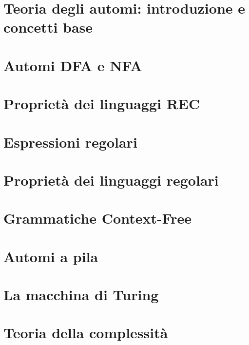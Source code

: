 \documentclass[12pt]{article}
\begin{document}


\tableofcontents
\restoregeometry

\section{Teoria degli automi: introduzione e concetti base}



\section{Automi DFA e NFA}


\section{Proprietà dei linguaggi REC}


\section{Espressioni regolari}


\section{Proprietà dei linguaggi regolari}


\section{Grammatiche Context-Free}


\section{Automi a pila}


\section{La macchina di Turing}


\section{Teoria della complessità}

\end{document}
